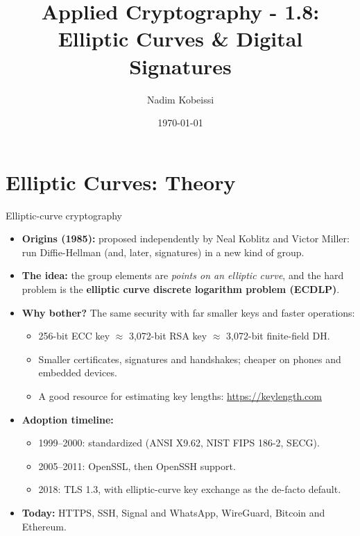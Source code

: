 \ifdefined\PRESENTATION\else\PassOptionsToClass{handout}{beamer}\fi\documentclass[aspectratio=169, lualatex]{beamer}
\title{Applied Cryptography - 1.8: Elliptic Curves \& Digital Signatures}
\author{Nadim Kobeissi}
\institute{Symbolic Software}
\date{\today}
\begin{document}
\begin{frame}[plain]
	\titlepage
\end{frame}

\section{Elliptic Curves: Theory}

\begin{frame}{Elliptic-curve cryptography}
	\begin{itemize}[<+->]
		\item \textbf{Origins (1985):} proposed independently by Neal Koblitz and Victor Miller: run Diffie-Hellman (and, later, signatures) in a new kind of group.
		\item \textbf{The idea:} the group elements are \emph{points on an elliptic curve}, and the hard problem is the \textbf{elliptic curve discrete logarithm problem (ECDLP)}.
		\item \textbf{Why bother?} The same security with far smaller keys and faster operations:
		      \begin{itemize}
			      \item 256-bit ECC key $\approx$ 3,072-bit RSA key $\approx$ 3,072-bit finite-field DH.
			      \item Smaller certificates, signatures and handshakes; cheaper on phones and embedded devices.
			      \item A good resource for estimating key lengths: \url{https://keylength.com}
		      \end{itemize}
		\item \textbf{Adoption timeline:}
		      \begin{itemize}
			      \item 1999--2000: standardized (ANSI X9.62, NIST FIPS 186-2, SECG).
			      \item 2005--2011: OpenSSL, then OpenSSH support.
			      \item 2018: TLS 1.3, with elliptic-curve key exchange as the de-facto default.
		      \end{itemize}
		\item \textbf{Today:} HTTPS, SSH, Signal and WhatsApp, WireGuard, Bitcoin and Ethereum.
	\end{itemize}
\end{frame}
\end{document}
